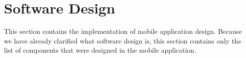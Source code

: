 \section{Software Design}\label{sec:software-design}
This section contains the implementation of mobile application design.
Because we have already clarified what software design is, this section contains only the list of components that were designed in the mobile application.







